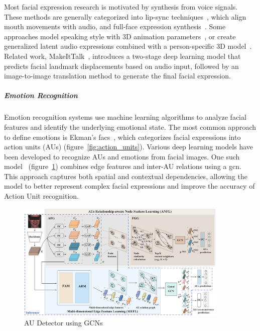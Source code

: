 \documentclass[../../main.tex]{subfiles}
\begin{document}
Most facial expression research is motivated by synthesis from voice signals. These methods are generally categorized into lip-sync techniques~\cite{yousaidthat, talkingface, lipmovements, lipsyncexpert}, which align mouth movements with audio, and full-face expression synthesis~\cite{eskimez, greenwood18, controllable_facial_synth}. Some approaches model speaking style with 3D animation parameters~\cite{cudeiro}, or create generalized latent audio expressions combined with a person-specific 3D model~\cite{FLAME}. Related work, MakeItTalk~\cite{Yang:2020:MakeItTalk}, introduces a two-stage deep learning model that predicts facial landmark displacements based on audio input, followed by an image-to-image translation method to generate the final facial expression. 

\subparagraph{Emotion Recognition}
\label{ch:background_work:sign_language_synthesis:3d_techniques:avatar_animation:face_animation:emotion_recognition}

Emotion recognition systems use machine learning algorithms to analyze facial features and identify the underlying emotional state. The most common approach to define emotions is Ekman's \gls{facs}~\cite{ekman1978facial}, which categorizes facial expressions into action units (AUs) (figure~\ref{fig:action_units}). Various deep learning models have been developed to recognize AUs and emotions from facial images. One such model~\cite{luo2022learning} (figure~\ref{fig:au_detector}) combines edge features and inter-AU relations using a \gls{gcn}. This approach captures both spatial and contextual dependencies, allowing the model to better represent complex facial expressions and improve the accuracy of Action Unit recognition.

\begin{figure}
    \centering
    \includegraphics[width=0.9\textwidth]{chapters/background_work/images/au_detector.pdf}
    \caption{AU Detector using GCNs}
    \label{fig:au_detector}
\end{figure}
\end{document}
